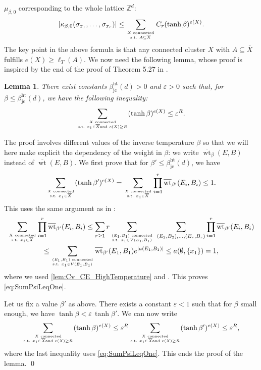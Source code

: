 \documentclass{amsart}
\newcommand{\field}[1]{\mathbb{#1}}
\newcommand{\Z}{\field{Z}}
\def\eps{\varepsilon}
\def\ka{\kappa}
\DeclareMathOperator\wt{wt}
\numberwithin{equation}{section}
\newtheorem{lemma}[theorem]{Lemma}
\theoremstyle{remark}
\renewenvironment{proof}[1][Proof]{\begin{trivlist}
\item[\hskip \labelsep {\bfseries #1:}]}{\qed\end{trivlist}}
\begin{document}
  $\mu_{\beta,0}$ corresponding to the whole lattice $\Z^d$:
  \begin{equation}\label{eq:BoundCum1}
|\ka_{\beta,0}(\sigma_{x_1},\dots,\sigma_{x_r}) | \le
  \sum_{X\text{ connected}\atop \text{s.t. } A \subseteq \overline{X}}
  C_r (\tanh \beta)^{e(X)}.
  \end{equation}
  The key point in the above formula is that any connected cluster $X$
  with $A \subseteq \overline{X}$ fulfills $e(X) \ge \ell_T(A)$.
  We now need the following lemma, whose proof is inspired by the end of the proof
  of Theorem 5.27 in \cite{Velenik}.
 \begin{lemma}
 \label{lem:BoudingTheSum_HT}
There exist constants $ \beta^{\text{ht}}_{\text{jc}}(d)>0$ and $\eps>0$
such that, for $\beta \le \beta^{\text{ht}}_{\text{jc}}(d)$,
 we have the following inequality:
 \[\sum_{X\text{ connected}\atop \text{s.t. } x_1 \in \overline{X}\text{and } e(X) \ge R} (\tanh \beta)^{e(X)}
 \le \eps^R.\]
 \end{lemma}
 \begin{proof}
The proof involves different values of the inverse temperature $\beta$
so that we will here make explicit the dependency of the weight in $\beta$:
we write $\overline{\wt}_\beta(E,B)$  instead of $\overline{\wt}(E,B)$.
 We first prove that for $\beta' \le \beta^{\text{ht}}_{\text{jc}}(d)$, we have
 \begin{equation}\label{eq:SumPsiLeqOne}
\sum_{X\text{ connected}\atop \text{s.t. } x_1 \in \overline{X}} (\tanh \beta')^{e(X)} =\sum_{X\text{ connected}\atop \text{s.t. } x_1 \in \overline{X}}  \prod_{i=1}^r \overline{\wt}_{\beta'}(E_i,B_i)  \le 1.
 \end{equation}
 This uses the same argument as in \cite[Eq. (5.31)]{Velenik}:
 \begin{multline*}
 \sum_{X\text{ connected}\atop \text{s.t. } x_1 \in \overline{X}}  \prod_{i=1}^r \overline{\wt}_{\beta'}(E_i,B_i)
 \le \sum_{r \ge 1} r \sum_{(E_1,B_1) \text{ connected} \atop \text{s.t. } x_1 \in V(E_1,B_1)} \ \sum_{(E_2,B_2),\dots,(E_r,B_r)}
 \prod_{i=1}^r \overline{\wt}_{\beta'}(E_i,B_i) \\
 \le \sum_{(E_1,B_1) \text{ connected} \atop \text{s.t. } x_1 \in V(E_1,B_1)}  \overline{\wt}_{\beta'}(E_1,B_1) e^{|a(E_1,B_1)|}
 \le a(\emptyset, \{x_1\}) =1,
 \end{multline*}
 where we used \cref{lem:Cv_CE_HighTemperature} and \cite[Theorem 5.4]{Velenik}.
 This proves \eqref{eq:SumPsiLeqOne}.
 
 Let us fix a value $\beta'$ as above. 
 There exists a constant $\eps <1$ such that for $\beta$ small enough, we have $\tanh \beta < \eps\, \tanh \beta'$.
 We can now write
 $$\sum_{X\text{ connected}\atop \text{s.t. } x_1 \in \overline{X} \text{and } e(X) \ge R} (\tanh \beta)^{e(X)} 
 \le  \eps^R \sum_{X\text{ connected}\atop \text{s.t. } x_1 \in \overline{X} \text{and } e(X) \ge R} (\tanh \beta')^{e(X)} \le \eps^R,$$
 where the last inequality uses \eqref{eq:SumPsiLeqOne}. This ends the proof of the lemma.
 \end{proof}
\end{document}
